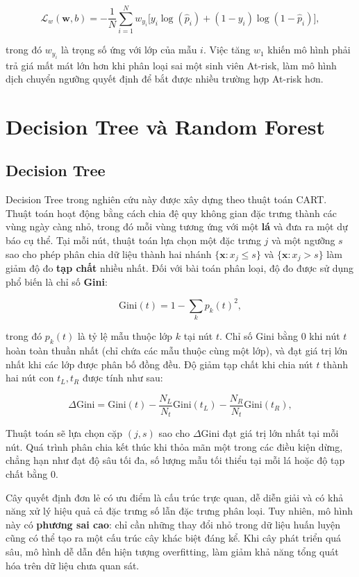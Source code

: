 \documentclass[a4paper]{report}
\begin{document}
\[
  \mathcal{L}_w(\mathbf{w}, b) = -\frac{1}{N} \sum_{i=1}^{N} w_{y_i}
  \Big[ y_i \log(\hat{p}_i) + (1 - y_i) \log(1 - \hat{p}_i) \Big],
\]

trong đó $w_{y_i}$ là trọng số ứng với lớp của mẫu $i$. Việc tăng $w_1$ khiến mô hình phải trả giá
mất mát lớn hơn khi phân loại sai một sinh viên At-risk, làm mô hình dịch
chuyển ngưỡng quyết định để bắt được nhiều trường hợp At-risk hơn.

\section{Decision Tree và Random Forest}

\subsection{Decision Tree}

Decision Tree trong nghiên cứu này được xây dựng theo thuật toán CART. Thuật
toán hoạt động bằng cách chia đệ quy không gian đặc trưng thành các vùng ngày
càng nhỏ, trong đó mỗi vùng tương ứng với một \textbf{lá} và đưa ra một dự báo
cụ thể. Tại mỗi nút, thuật
toán lựa chọn một đặc trưng $j$ và một ngưỡng $s$ sao cho phép phân chia dữ
liệu thành hai nhánh $\{\mathbf{x}:x_j\le s\}$ và
$\{\mathbf{x}:x_j>s\}$ làm giảm độ đo \textbf{tạp chất} nhiều nhất.
Đối với bài toán phân loại, độ đo được sử dụng phổ biến là chỉ số
\textbf{Gini}:

\[
  \text{Gini}(t) = 1 - \sum_{k} p_k(t)^2,
\]

trong đó $p_k(t)$ là tỷ lệ mẫu thuộc lớp $k$ tại nút $t$. Chỉ số Gini bằng 0
khi nút $t$ hoàn toàn thuần nhất (chỉ chứa các mẫu thuộc cùng một lớp), và đạt
giá trị lớn nhất khi các lớp được phân bố đồng đều. Độ giảm tạp chất khi chia
nút $t$ thành hai nút con $t_L, t_R$ được tính như sau:

\[
  \Delta \text{Gini} = \text{Gini}(t) - \frac{N_L}{N_t}\text{Gini}(t_L)
  - \frac{N_R}{N_t}\text{Gini}(t_R),
\]

Thuật toán sẽ lựa chọn cặp $(j,s)$ sao cho $\Delta \text{Gini}$ đạt giá trị lớn
nhất tại mỗi nút. Quá trình phân chia kết thúc khi thỏa mãn một trong các điều
kiện dừng, chẳng hạn như đạt độ sâu tối đa, số lượng mẫu tối thiểu tại mỗi lá
hoặc độ tạp chất bằng 0.

Cây quyết định đơn lẻ có ưu điểm là cấu trúc trực quan, dễ diễn giải và có khả
năng xử lý hiệu quả cả đặc trưng số lẫn đặc trưng phân loại. Tuy nhiên, mô hình
này có \textbf{phương sai cao}: chỉ cần những thay đổi nhỏ trong dữ liệu huấn
luyện cũng có thể tạo ra một cấu trúc cây khác biệt đáng kể. Khi cây phát triển
quá sâu, mô hình dễ dẫn đến hiện tượng overfitting, làm
giảm khả năng tổng quát hóa trên dữ liệu chưa quan sát.
\end{document}
